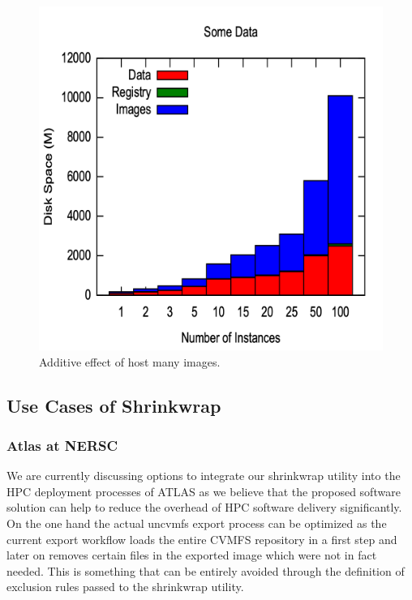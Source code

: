 \documentclass[sigconf]{acmart}
\begin{document}
\begin{figure}[h]
\includegraphics[width=\columnwidth]{plots/specification_size.png}
\caption{Additive effect of host many images.}
\label{figure:spec-size}
\end{figure}

\subsection{Use Cases of Shrinkwrap}

\subsubsection{Atlas at NERSC}

We are currently discussing options to integrate our shrinkwrap utility into the HPC deployment processes of ATLAS as we believe that the proposed software solution can help to reduce the overhead of HPC software delivery significantly. On the one hand the actual uncvmfs export process can be optimized as the current export workflow loads the entire CVMFS repository in a first step and later on removes certain files in the exported image which were not in fact needed. This is something that can be entirely avoided through the definition of exclusion rules passed to the shrinkwrap utility.
\end{document}
